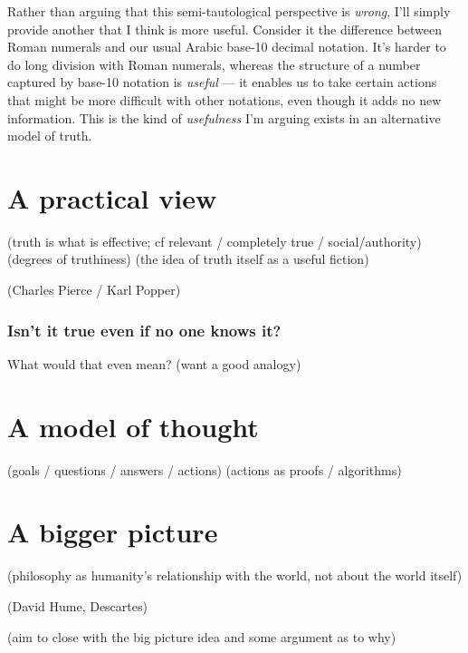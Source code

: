 \documentclass[20pt,]{extarticle}
\begin{document}
Rather than arguing that this semi-tautological perspective is
\emph{wrong}, I'll simply provide another that I think is more useful.
Consider it the difference between Roman numerals and our usual Arabic
base-10 decimal notation. It's harder to do long division with Roman
numerals, whereas the structure of a number captured by base-10 notation
is \emph{useful} --- it enables us to take certain actions that might be
more difficult with other notations, even though it adds no new
information. This is the kind of \emph{usefulness} I'm arguing exists in
an alternative model of truth.

\section{A practical view}\label{a-practical-view}

(truth is what is effective; cf relevant / completely true /
social/authority) (degrees of truthiness) (the idea of truth itself as a
useful fiction)

(Charles Pierce / Karl Popper)

\subsubsection{Isn't it true even if no one knows
it?}\label{isnt-it-true-even-if-no-one-knows-it}

What would that even mean? (want a good analogy)

\section{A model of thought}\label{a-model-of-thought}

(goals / questions / answers / actions) (actions as proofs / algorithms)

\section{A bigger picture}\label{a-bigger-picture}

(philosophy as humanity's relationship with the world, not about the
world itself)

(David Hume, Descartes)

(aim to close with the big picture idea and some argument as to why)
\end{document}

